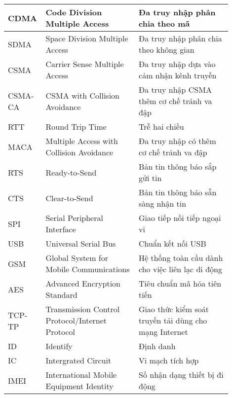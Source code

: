 \begin{longtable}{m{0.1\linewidth} m{0.4\linewidth} m{0.4\linewidth}}
      \hline
      CDMA & Code Division Multiple Access & Đa truy nhập phân chia theo mã\\
      \hline
      SDMA & Space Division Multiple Access & Đa truy nhập phân chia theo không gian\\
      \hline
      CSMA & Carrier Sense Multiple Access & Đa truy nhập dựa vào cảm nhận kênh truyền\\
      \hline
      CSMA-CA & CSMA with Collision Avoidance & Đa truy nhập CSMA thêm cơ chế tránh va đập\\
      \hline
      RTT & Round Trip Time & Trễ hai chiều\\
      \hline
      MACA & Multiple Access with Collision Avoidance & Đa truy nhập có thêm cơ chế tránh va đập\\
      \hline
      RTS & Ready-to-Send & Bản tin thông báo sắp gửi tin\\
      \hline
      CTS & Clear-to-Send & Bản tin thông báo sẵn sàng nhận tin\\
      \hline
      SPI & Serial Peripheral Interface & Giao tiếp nối tiếp ngoại vi\\
      \hline 
       USB & Universal Serial Bus & Chuẩn kết nối USB\\
      \hline
      GSM & Global System for Mobile Communications & Hệ thống toàn cầu dành cho việc liên lạc di động\\
      \hline
      AES & Advanced Encryption Standard & Tiêu chuẩn mã hóa tiên tiến\\
      \hline
      TCP-TP & Transmission Control Protocol/Internet Protocol & Giao thức kiểm soát truyền tải dùng cho mạng Internet\\
      \hline
      ID & Identify & Định danh\\
      \hline  
       IC & Intergrated Circuit & Vi mạch tích hợp\\ 
      \hline 
       IMEI & International Mobile Equipment Identity & Số nhận dạng thiết bị đi động\\
      \hline 
\end{longtable}
